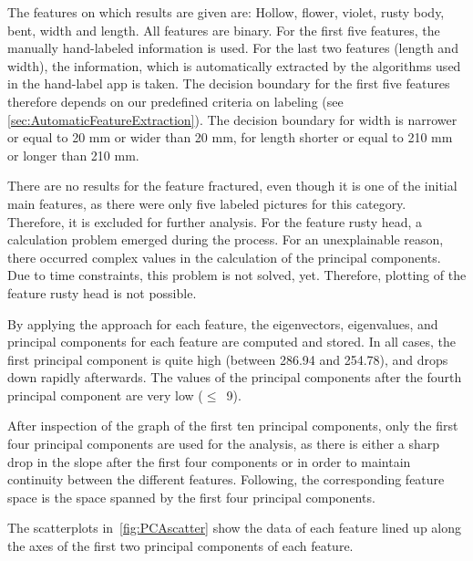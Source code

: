 \bigskip
The features on which results are given are: Hollow, flower, violet, rusty body, bent, width and length. All features are binary. For the first five features, the manually hand-labeled information is used. For the last two features (length and width), the information, which is automatically extracted by the algorithms used in the hand-label app is taken. The decision boundary for the first five features therefore depends on our predefined criteria on labeling (see \autoref{sec:AutomaticFeatureExtraction}). The decision boundary for width is narrower or equal to 20 mm or wider than 20 mm, for length shorter or equal to 210 mm or longer than 210 mm.

There are no results for the feature fractured, even though it is one of the initial main features, as there were only five labeled pictures for this category. Therefore, it is excluded for further analysis. For the feature rusty head, a calculation problem emerged during the process. For an unexplainable reason, there occurred complex values in the calculation of the principal components. Due to time constraints, this problem is not solved, yet. Therefore, plotting of the feature rusty head is not possible.

By applying the approach for each feature, the eigenvectors, eigenvalues, and principal components for each feature are computed and stored. In all cases, the first principal component is quite high (between 286.94 and 254.78), and drops down rapidly afterwards. The values of the principal components after the fourth principal component are very low ($\leq$~9).

\bigskip
After inspection of the graph of the first ten principal components,  only the first four principal components are used for the analysis, as there is either a sharp drop in the slope after the first four components or in order to maintain continuity between the different features. Following, the corresponding feature space is the space spanned by the first four principal components.

The scatterplots in~\autoref{fig:PCAscatter} show the data of each feature lined up along the axes of the first two principal components of each feature.

